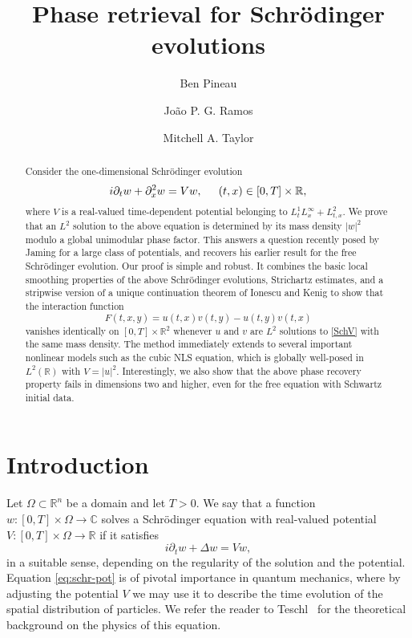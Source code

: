 \documentclass[11pt]{amsart}
\title{Phase retrieval for Schr\"odinger evolutions}
\author{Ben Pineau}
\author{João P. G. Ramos}
\author[Mitchell A. Taylor]{Mitchell A. Taylor}
\theoremstyle{remark}
\newcommand{\R}{\mathbb R}
\newcommand{\C}{\mathbb C}
\newcommand{\1}{\mathbf 1}
\begin{document}
\begin{abstract}
Consider the one-dimensional Schr\"odinger evolution
\begin{equation}\label{SchV}
i\partial_tw+\partial_x^2w=Vw,\hspace{5mm}(t,x)\in [0,T]\times\mathbb{R}   , 
\end{equation}
where $V$ is a real-valued time-dependent potential belonging to $L^1_tL^\infty_x+L^2_{t,x}$. We prove that an $L^2$ solution to the above equation is determined by its mass density $|w|^2$ modulo a global unimodular phase factor. This answers a question recently posed by Jaming \cite{Jaming2025} for a large class of  potentials, and recovers his earlier result for the free Schr\"odinger evolution. Our proof is simple and robust. It combines the basic local smoothing properties of the above Schr\"odinger evolutions, Strichartz estimates, and a stripwise version of a unique continuation theorem of Ionescu and Kenig to show that the interaction function
\begin{equation*}
F(t,x,y)=u(t,x)v(t,y)-u(t,y)v(t,x)    
\end{equation*}
vanishes identically on $[0,T]\times\mathbb{R}^2$ whenever $u$ and $v$ are $L^2$ solutions to \eqref{SchV} with the same mass density. The method immediately extends to several important nonlinear models such as the cubic NLS equation, which is globally well-posed in $L^2(\mathbb{R})$ with $V=|u|^2$. Interestingly, we also show that the above phase recovery property fails in dimensions two and higher, even for the free equation  with Schwartz initial data.
\end{abstract}

\maketitle


\section{Introduction}

Let $\Omega\subset\R^n$ be a domain and let $T>0$. We say that a function
$w:[0,T]\times\Omega\to\C$ solves a Schr\"odinger equation with real-valued potential
$V:[0,T]\times\Omega\to\R$ if it satisfies
\begin{equation}\label{eq:schr-pot}
i\partial_t w+\Delta w=Vw,
\end{equation}
in a suitable sense, depending on the regularity of the solution and the potential. Equation \eqref{eq:schr-pot} is of pivotal importance in quantum mechanics, where by adjusting the potential $V$ we may use it to describe the time evolution of the spatial distribution of particles. We refer the reader to Teschl~\cite{TeschlBook} for the theoretical background on the physics of this equation.
\end{document}
